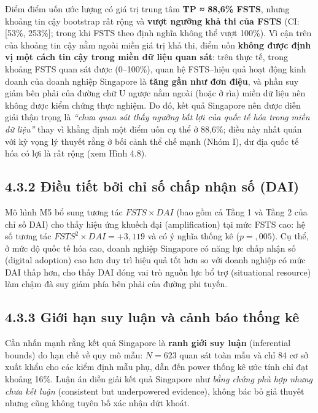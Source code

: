 \documentclass[
  a4paper,
  13pt]{extreport}
\begin{document}
Điểm điểm uốn ước lượng có giá trị trung tâm \textbf{TP ≈ 88,6\% FSTS},
nhưng khoảng tin cậy bootstrap rất rộng và \textbf{vượt ngưỡng khả thi
của FSTS} (CI: {[}53\%, 253\%{]}; trong khi FSTS theo định nghĩa không
thể vượt 100\%). Vì cận trên của khoảng tin cậy nằm ngoài miền giá trị
khả thi, điểm uốn \textbf{không được định vị một cách tin cậy trong miền
dữ liệu quan sát}: trên thực tế, trong khoảng FSTS quan sát được
(0--100\%), quan hệ FSTS--hiệu quả hoạt động kinh doanh của doanh nghiệp
Singapore là \textbf{tăng gần như đơn điệu}, và phần suy giảm bên phải
của đường chữ U ngược nằm ngoài (hoặc ở rìa) miền dữ liệu nên không được
kiểm chứng thực nghiệm. Do đó, kết quả Singapore nên được diễn giải thận
trọng là \emph{``chưa quan sát thấy ngưỡng bất lợi của quốc tế hóa trong
miền dữ liệu''} thay vì khẳng định một điểm uốn cụ thể ở 88,6\%; điều
này nhất quán với kỳ vọng lý thuyết rằng ở bối cảnh thể chế mạnh (Nhóm
I), dư địa quốc tế hóa có lợi là rất rộng (xem Hình 4.8).

\hypertarget{ux111iux1ec1u-tiux1ebft-bux1edfi-chux1ec9-sux1ed1-chux1ea5p-nhux1eadn-sux1ed1-dai}{%
\subsection{4.3.2 Điều tiết bởi chỉ số chấp nhận số
(DAI)}\label{ux111iux1ec1u-tiux1ebft-bux1edfi-chux1ec9-sux1ed1-chux1ea5p-nhux1eadn-sux1ed1-dai}}

Mô hình M5 bổ sung tương tác \(FSTS \times DAI\) (bao gồm cả Tầng 1 và
Tầng 2 của chỉ số DAI) cho thấy hiệu ứng khuếch đại (amplification) tại
mức FSTS cao: hệ số tương tác \(FSTS^2 \times DAI = +3{,}119\) và có ý
nghĩa thống kê (\(p = {,}005\)). Cụ thể, ở mức độ quốc tế hóa cao, doanh
nghiệp Singapore có năng lực chấp nhận số (digital adoption) cao hơn duy
trì hiệu quả tốt hơn so với doanh nghiệp có mức DAI thấp hơn, cho thấy
DAI đóng vai trò nguồn lực bổ trợ (situational resource) làm chậm đà suy
giảm phía bên phải của đường phi tuyến.

\hypertarget{giux1edbi-hux1ea1n-suy-luux1eadn-vuxe0-cux1ea3nh-buxe1o-thux1ed1ng-kuxea}{%
\subsection{4.3.3 Giới hạn suy luận và cảnh báo thống
kê}\label{giux1edbi-hux1ea1n-suy-luux1eadn-vuxe0-cux1ea3nh-buxe1o-thux1ed1ng-kuxea}}

Cần nhấn mạnh rằng kết quả Singapore là \textbf{ranh giới suy luận}
(inferential bounds) do hạn chế về quy mô mẫu: \(N = 623\) quan sát toàn
mẫu và chỉ 84 cơ sở xuất khẩu cho các kiểm định mẫu phụ, dẫn đến power
thống kê ước tính chỉ đạt khoảng 16\%. Luận án diễn giải kết quả
Singapore như \emph{bằng chứng phù hợp nhưng chưa kết luận} (consistent
but underpowered evidence), không bác bỏ giả thuyết nhưng cũng không
tuyên bố xác nhận dứt khoát.
\end{document}
